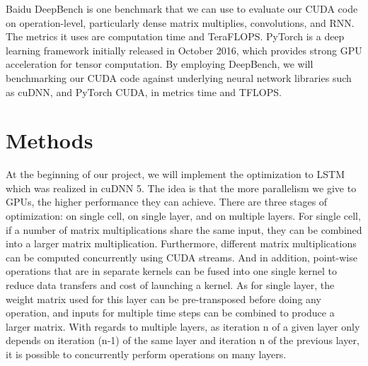 \documentclass{article}
\begin{document}
Baidu DeepBench\cite{DeepBench} is one benchmark that we can use to evaluate our CUDA code on operation-level, particularly dense matrix multiplies, convolutions, and RNN. The metrics it uses are computation time and TeraFLOPS. 
PyTorch\cite{PyTorch} is a deep learning framework initially released in October 2016, which provides strong GPU acceleration for tensor computation. 
By employing DeepBench, we will benchmarking our CUDA code against underlying neural network libraries such as cuDNN, and PyTorch CUDA, in metrics time and TFLOPS.


\section{Methods}

At the beginning of our project, we will implement the optimization to LSTM which was realized in cuDNN 5\cite{appleyard2016optimizing}. The idea is that the more parallelism we give to GPUs, the higher performance they can achieve. There are three stages of optimization: on single cell, on single layer, and on multiple layers. For single cell, if a number of matrix multiplications share the same input, they can be combined into a larger matrix multiplication. Furthermore, different matrix multiplications can be computed concurrently using CUDA streams. And in addition, point-wise operations that are in separate kernels can be fused into one single kernel to reduce data transfers and cost of launching a kernel. As for single layer, the weight matrix used for this layer can be pre-transposed before doing any operation, and inputs for multiple time steps can be combined to produce a larger matrix. With regards to multiple layers, as iteration n of a given layer only depends on iteration (n-1) of the same layer and iteration n of the previous layer, it is possible to concurrently perform operations on many layers.

\medskip


\end{document}
